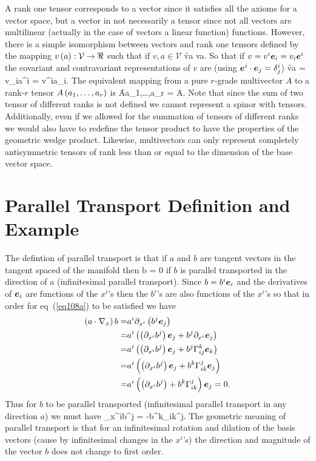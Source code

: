 A rank one tensor corresponds to a vector since it satisfies all the axioms for a vector space, but a vector in not necessarily a tensor since not all vectors
are multilinear (actually in the case of vectors a linear function) functions.  However, there is a simple isomorphism between vectors and 
rank one tensors defined by the mapping ${v}\left ( {a} \right ):\mathcal{V}\rightarrow\Re$ such that if $v,a \in\mathcal{V}$
\be
	\f{v}{a} \equiv v\cdot a.
\ee
So that if $v = v^{i}\bm{e}_{i} = v_{i}\bm{e}^{i}$ the covariant and contravariant representations of $v$ are 
(using $\bm{e}^{i}\cdot\bm{e}_{j} = \delta^{i}_{j}$)
\be
	\f{v}{a} = v_{i}a^{i} = v^{i}a_{i}.
\ee
The equivalent mapping from a pure $r$-grade multivector $A$ to a rank-$r$ tensor ${A}\left ( {a_{1},\dots,a_{r}} \right )$ is
\be
	\f{A}{a_{1},\dots,a_{r}} = A\cdot{}.\label{eq7_24a}
\ee
Note that since the sum of two tensor of different ranks is not defined we cannot represent a spinor with tensors.  
Additionally, even if we allowed for the summation of tensors of different ranks we would also have to redefine the
tensor product to have the properties of the geometric wedge product.  Likewise, multivectors can only represent 
completely antisymmetric tensors of rank less than or equal to the dimension of the base vector space. 

\section{Parallel Transport Definition and Example}
The defintion of parallel transport is that if $a$ and $b$ are tangent vectors in the tangent spaced of the manifold then
\be
	b = 0 \label{eq108a}
\ee
if $b$ is parallel transported in the direction of a (infinitesimal parallel transport).  Since $b = b^{i}\bm{e}_{i}$ and the derivatives of $\bm{e}_{i}$ are functions of the $x^{i}$'s then the $b^{i}$'s are
also functions of the $x^{i}$'s so that in order for eq~(\ref{eq108a}) to be satisfied we have
\begin{align}
	\left ( {a\cdot\nabla_{x}} \right ) b =& a^{i}\partial_{x^{i}}\left ( {b^{j}\bm{e}_{j}} \right ) \nonumber \\
	                          =& a^{i}\left ( {\left ( {\partial_{x^{i}}b^{j}} \right )\bm{e}_{j} + b^{j}\partial_{x^{i}}\bm{e}_{j}} \right ) \nonumber \\
	                          =& a^{i}\left ( {\left ( {\partial_{x^{i}}b^{j}} \right )\bm{e}_{j} + b^{j}\Gamma_{ij}^{k}\bm{e}_{k}} \right ) \nonumber \\
	                          =& a^{i}\left ( {\left ( {\partial_{x^{i}}b^{j}} \right )\bm{e}_{j} + b^{k}\Gamma_{ik}^{j}\bm{e}_{j}} \right )\nonumber \\
	                          =& a^{i}\left ( {\left ( {\partial_{x^{i}}b^{j}} \right ) + b^{k}\Gamma_{ik}^{j}} \right )\bm{e}_{j} = 0.
\end{align}
Thus for $b$ to be parallel transported (infinitesimal parallel transport in any direction $a$) we must have
\be
	\partial_{x^{i}}b^{j} = -b^{k}\Gamma_{ik}^{j}. \label{eq121a}
\ee
The geometric meaning of parallel transport is that for an infinitesimal rotation and dilation of the basis vectors (cause by infinitesimal changes in the $x^{i}$'s) the direction and magnitude of the vector $b$ does not change to first order.

